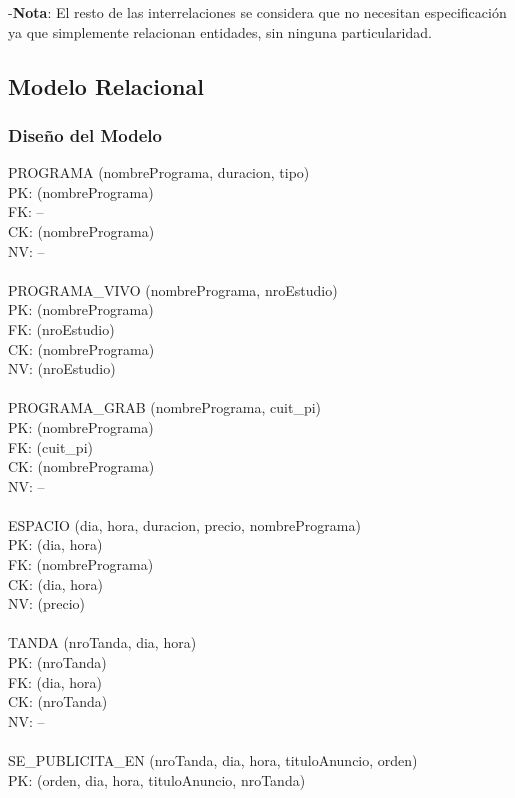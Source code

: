 \documentclass[a4paper,10pt,titlepage]{article}
\begin{document}
-\textbf{Nota}: El resto de las interrelaciones se considera que no necesitan especificaci\'on ya que simplemente relacionan entidades, sin ninguna particularidad. 

\pagebreak
\subsection{Modelo Relacional}

\subsubsection{Dise\~no del Modelo}

PROGRAMA (nombrePrograma, duracion, tipo)\\
PK: (nombrePrograma)\\
FK: --\\
CK: (nombrePrograma)\\
NV: --\\
\\
PROGRAMA\_VIVO (nombrePrograma, nroEstudio)\\
PK: (nombrePrograma)\\
FK: (nroEstudio)\\
CK: (nombrePrograma)\\
NV: (nroEstudio)\\
\\
PROGRAMA\_GRAB (nombrePrograma, cuit\_pi)\\
PK: (nombrePrograma)\\
FK: (cuit\_pi)\\
CK: (nombrePrograma)\\
NV: --\\
\\
ESPACIO (dia, hora, duracion, precio, nombrePrograma)\\
PK: (dia, hora)\\
FK: (nombrePrograma)\\
CK: (dia, hora)\\
NV: (precio)\\
\\
TANDA (nroTanda, dia, hora)\\
PK: (nroTanda)\\
FK: (dia, hora)\\
CK: (nroTanda)\\
NV: --\\
\\
SE\_PUBLICITA\_EN (nroTanda, dia, hora, tituloAnuncio, orden)\\
PK: (orden, dia, hora, tituloAnuncio, nroTanda)\\
\end{document}
